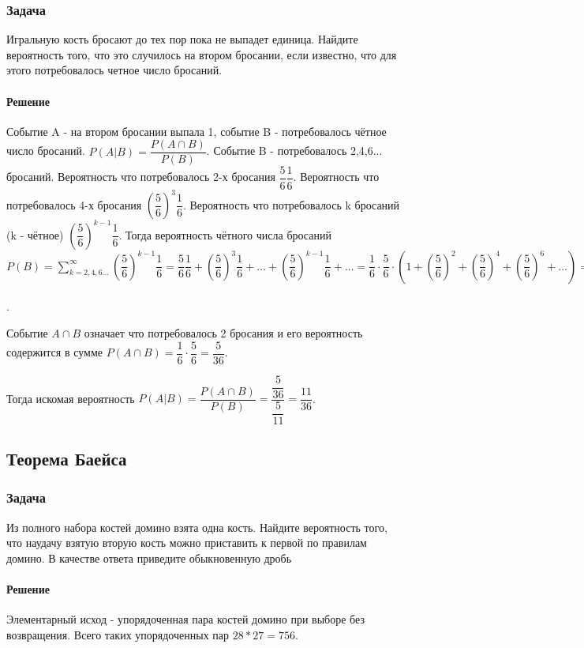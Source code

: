 \documentclass[a4paper,12pt]{article}
\begin{document}
\subsubsection*{Задача}
Игральную кость бросают до тех пор пока не выпадет единица. Найдите вероятность того, что это случилось на втором бросании, если известно, что для этого потребовалось четное число бросаний.
\paragraph{Решение}
Событие A - на втором бросании выпала 1, событие B - потребовалось чётное число бросаний. \(P(A|B)=\dfrac{P(A\cap B)}{P(B)}\). Событие B - потребовалось 2,4,6... бросаний. Вероятность что потребовалось 2-х бросания \(\dfrac{5}{6}\dfrac{1}{6}\). Вероятность что потребовалось 4-х бросания \(\left(\dfrac{5}{6}\right)^3\dfrac{1}{6}\). Вероятность что потребовалось k бросаний (k - чётное) \(\left(\dfrac{5}{6}\right)^{k-1}\dfrac{1}{6}\). Тогда вероятность чётного числа бросаний \(P(B)=\sum_{k=2,4,6...}^{\infty}\left(\dfrac{5}{6}\right)^{k-1}\dfrac{1}{6}=\dfrac{5}{6}\dfrac{1}{6}+\left(\dfrac{5}{6}\right)^3\dfrac{1}{6}+ \ldots+\left(\dfrac{5}{6}\right)^{k-1}\dfrac{1}{6}+ \ldots=\dfrac{1}{6} \cdot \dfrac{5}{6}\cdot\left(1+\left(\dfrac{5}{6}\right)^2+\left(\dfrac{5}{6}\right)^4+\left(\dfrac{5}{6}\right)^6+\ldots\right)=\dfrac{1}{6}\cdot\dfrac{5}{6}\cdot\dfrac{1}{1-\left(\dfrac{5}{6}\right)^2}=\dfrac{5}{36}\cdot\dfrac{36}{11}=\dfrac{5}{11}\). 

Событие \(A \cap B\)  означает что потребовалось 2 бросания и его вероятность содержится в сумме \( P(A\cap B)=\dfrac{1}{6}\cdot\dfrac{5}{6}=\dfrac{5}{36}\).

Тогда искомая вероятность \(P(A|B)=\dfrac{P(A\cap B)}{P(B)}=\dfrac{\dfrac{5}{36}}{\dfrac{5}{11}}=\dfrac{11}{36}\).




\subsection{Теорема Баейса}
\subsubsection*{Задача}
Из полного набора костей домино взята одна кость. Найдите вероятность того, что наудачу взятую вторую кость можно приставить к первой по правилам домино. В качестве ответа приведите обыкновенную дробь

\paragraph{Решение}
Элементарный исход - упорядоченная пара костей домино при выборе без возвращения. Всего таких упорядоченных пар \(28*27=756\). 
\end{document}
